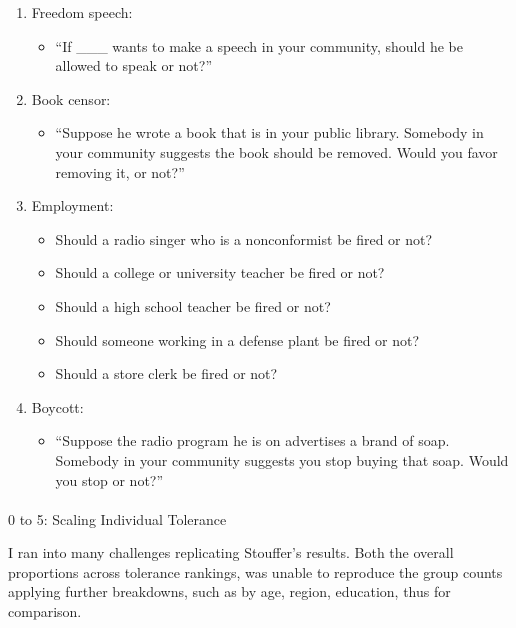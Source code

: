 \documentclass[
  letterpaper,
  DIV=11,
  numbers=noendperiod]{scrartcl}
\makeatletter
\let\oldparagraph\paragraph
\renewcommand{\paragraph}{
    \@ifstar
      \xxxParagraphStar
      \xxxParagraphNoStar
  }
\newcommand{\xxxParagraphStar}[1]{\oldparagraph*{#1}\mbox{}}
\newcommand{\xxxParagraphNoStar}[1]{\oldparagraph{#1}\mbox{}}
\providecommand{\tightlist}{%
  \setlength{\itemsep}{0pt}\setlength{\parskip}{0pt}}\usepackage{longtable,booktabs,array}
\makeatother
\begin{document}
\begin{enumerate}
\def\labelenumi{\arabic{enumi}.}
\item
  Freedom speech:

  \begin{itemize}
  \tightlist
  \item
    ``If \_\_\_ wants to make a speech in your community, should he be
    allowed to speak or not?''
  \end{itemize}
\item
  Book censor:

  \begin{itemize}
  \tightlist
  \item
    ``Suppose he wrote a book that is in your public library. Somebody
    in your community suggests the book should be removed. Would you
    favor removing it, or not?''
  \end{itemize}
\item
  Employment:

  \begin{itemize}
  \tightlist
  \item
    Should a radio singer who is a nonconformist be fired or not?
  \item
    Should a college or university teacher be fired or not?
  \item
    Should a high school teacher be fired or not?
  \item
    Should someone working in a defense plant be fired or not?
  \item
    Should a store clerk be fired or not?
  \end{itemize}
\item
  Boycott:

  \begin{itemize}
  \tightlist
  \item
    ``Suppose the radio program he is on advertises a brand of soap.
    Somebody in your community suggests you stop buying that soap. Would
    you stop or not?''
  \end{itemize}
\end{enumerate}

\paragraph{0 to 5: Scaling Individual
Tolerance}\label{to-5-scaling-individual-tolerance}

I ran into many challenges replicating Stouffer's results. Both the
overall proportions across tolerance rankings, was unable to reproduce
the group counts applying further breakdowns, such as by age, region,
education, thus for comparison.
\end{document}
